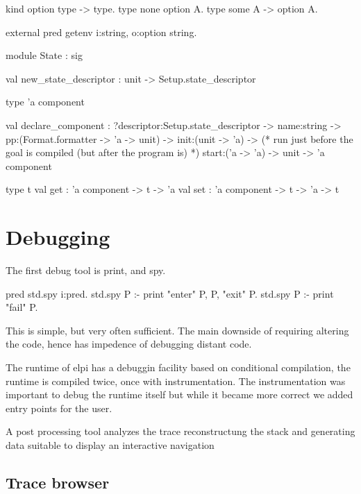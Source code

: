 \documentclass[a4paper, 11pt]{book}
\begin{document}
\begin{elpicode}
kind option type -> type.
type none option A.
type some A -> option A.

external pred getenv i:string, o:option string.
\end{elpicode}

\begin{ocamlcode}
module State : sig

  val new_state_descriptor : unit -> Setup.state_descriptor

  type 'a component

  val declare_component :
    ?descriptor:Setup.state_descriptor ->
    name:string ->
    pp:(Format.formatter -> 'a -> unit) ->
    init:(unit -> 'a) ->
    (* run just before the goal is compiled (but after the program is) *)
    start:('a -> 'a) ->
    unit ->
      'a component
  
  type t
  val get : 'a component -> t -> 'a
  val set : 'a component -> t -> 'a -> t
\end{ocamlcode}


\section{Debugging}

The first debug tool is print, and spy.

\begin{elpicode}
pred std.spy i:pred.
std.spy P :- print "enter" P, P, "exit" P.
std.spy P :- print "fail" P.
\end{elpicode}

This is simple, but very often sufficient.
The main downside of requiring altering the code, hence has impedence
of debugging distant code.

The runtime of elpi has a debuggin facility based on conditional compilation,
the runtime is compiled twice, once with instrumentation.
The instrumentation was important to debug the runtime itself
but while it became more correct we added entry points for the user.

A post processing tool analyzes the trace reconstructung the
stack and generating data suitable to display an interactive navigation

\subsection{Trace browser}\label{sec:trace}
\end{document}
